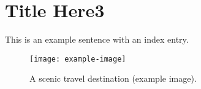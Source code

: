 \newpage
\chapter{Title Here3}
This is an example sentence with an index entry.
\lipsum[1]  %
\begin{figure}[htbp]
  \centering
  \texttt{[image: example-image]} %
  \caption{A scenic travel destination (example image).}
\end{figure}
\lipsum[1]  %
\lipsum[2]  %




